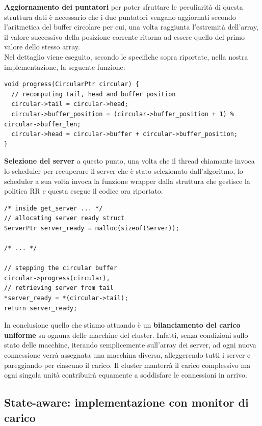 \documentclass[italian]{tktltiki2}
\begin{document}
\textbf{Aggiornamento dei puntatori} per poter sfruttare le peculiarità di questa struttura dati è necessario che i due puntatori vengano aggiornati secondo l'aritmetica del buffer circolare per cui, una volta raggiunta l'estremità dell'array, il valore successivo della posizione corrente ritorna ad essere quello del primo valore dello stesso array. 
\\
Nel dettaglio viene eseguito, secondo le specifiche sopra riportate, nella nostra implementazione, la seguente funzione:
\begin{lstlisting}
void progress(CircularPtr circular) {
  // recomputing tail, head and buffer position
  circular->tail = circular->head;
  circular->buffer_position = (circular->buffer_position + 1) % circular->buffer_len;
  circular->head = circular->buffer + circular->buffer_position;
}
\end{lstlisting}
\textbf{Selezione del server} a questo punto, una volta che il thread chiamante invoca lo scheduler per recuperare il server che è stato selezionato dall'algoritmo, lo scheduler a sua volta invoca la funzione wrapper dalla struttura che gestisce la politica RR e questa esegue il codice ora riportato.
\begin{lstlisting}
/* inside get_server ... */
// allocating server ready struct
ServerPtr server_ready = malloc(sizeof(Server));

/* ... */

// stepping the circular buffer
circular->progress(circular),
// retrieving server from tail 
*server_ready = *(circular->tail);
return server_ready;
\end{lstlisting}
In conclusione quello che stiamo attuando è un \textbf{bilanciamento del carico uniforme} su ognuna delle macchine del cluster. Infatti, senza condizioni sullo stato delle macchine, iterando semplicemente sull'array dei server, ad ogni nuova connessione verrà assegnata una macchina diversa, alleggerendo tutti i server e pareggiando per ciascuno il carico. Il cluster manterrà il carico complessivo ma ogni singola unità contribuirà equamente a soddisfare le connessioni in arrivo.
\newpage
\subsection{State-aware: implementazione con monitor di carico}
\end{document}
